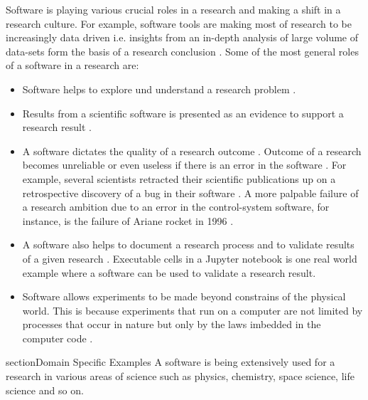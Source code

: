 Software is playing various crucial roles in a research and making a shift in a research culture. For example, software tools are making most of research to be increasingly data driven i.e. insights from an in-depth analysis of large volume of data-sets form the basis of a research conclusion \citep{goble2014better, jay2020software}. Some of the most general roles of a software in a research are:

\begin{itemize}%

	\item Software helps to explore und understand a research problem \citep{hannay2009scientists}.
	\item Results from a scientific software is presented as an evidence to support a research result \citep{kanewala2014testing}. 
	\item A software dictates the quality of a research outcome \citep{hannay2009scientists}. Outcome of a research becomes unreliable or even useless if there is an error in the software \citep{soergel2014rampant}. For example, several scientists retracted their scientific publications up on a retrospective discovery of a bug in their software \citep{wilson2014best, merali2010computational, miller2006scientist}. A more palpable failure of a research ambition due to an error in the control-system software, for instance, is the failure of Ariane rocket in 1996 \citep{enwiki:1054482061}.  
	\item A software also helps to document a research process and to validate results of a given research \citep{jay2020software}. Executable cells in a Jupyter notebook is one real world example where a software can be used to validate a research result.
	\item Software allows experiments to be made beyond constrains of the physical world. This is because experiments that run on a computer are not limited by processes that occur in nature but only by the laws imbedded in the computer code \citep{wolfram1984computer}. 

\end{itemize}

section{Domain Specific Examples}
\label{subsec:background:first_section:second_subsection}
A software is being extensively used for a research in various areas of science such as physics, chemistry, space science, life science and so on.

